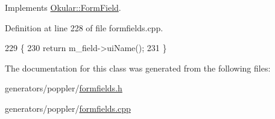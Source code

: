 Implements \hyperlink{classOkular_1_1FormField_a32a3eed7310ff961cc2d748135d4173b}{Okular\+::\+Form\+Field}.



Definition at line 228 of file formfields.\+cpp.


\begin{DoxyCode}
229 \{
230     \textcolor{keywordflow}{return} m\_field->uiName();
231 \}
\end{DoxyCode}


The documentation for this class was generated from the following files\+:\begin{DoxyCompactItemize}
\item 
generators/poppler/\hyperlink{formfields_8h}{formfields.\+h}\item 
generators/poppler/\hyperlink{formfields_8cpp}{formfields.\+cpp}\end{DoxyCompactItemize}

